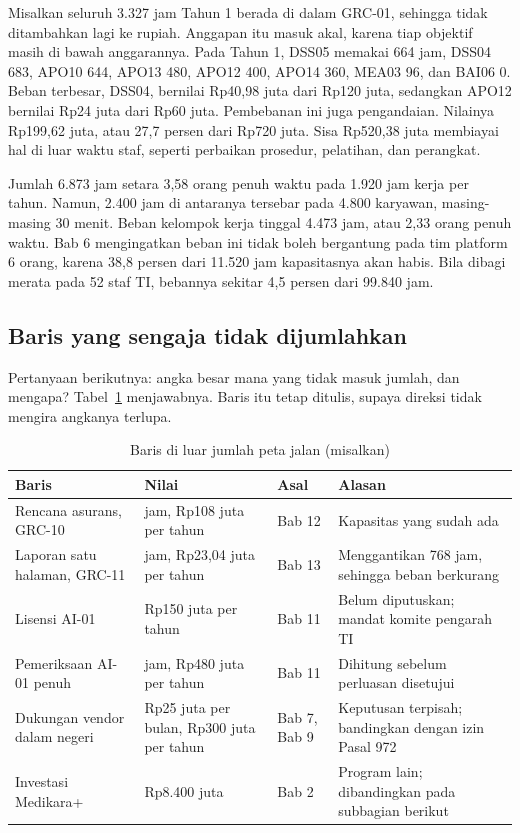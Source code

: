 Misalkan seluruh 3.327 jam Tahun 1 berada di dalam GRC-01, sehingga tidak ditambahkan lagi ke
rupiah. Anggapan itu masuk akal, karena tiap objektif masih di bawah anggarannya. Pada Tahun 1,
DSS05 memakai 664 jam, DSS04 683, APO10 644, APO13 480, APO12 400, APO14 360, MEA03 96, dan BAI06
0. Beban terbesar, DSS04, bernilai Rp40,98 juta dari Rp120 juta, sedangkan APO12 bernilai Rp24
juta dari Rp60 juta. Pembebanan ini juga pengandaian. Nilainya Rp199,62 juta, atau 27,7 persen dari
Rp720 juta. Sisa Rp520,38 juta membiayai hal di luar waktu staf, seperti perbaikan prosedur,
pelatihan, dan perangkat.

Jumlah 6.873 jam setara 3,58 orang penuh waktu pada 1.920 jam kerja per tahun. Namun, 2.400 jam di
antaranya tersebar pada 4.800 karyawan, masing-masing 30 menit. Beban kelompok kerja tinggal 4.473
jam, atau 2,33 orang penuh waktu. Bab 6 mengingatkan beban ini tidak boleh bergantung pada tim
platform 6 orang, karena 38,8 persen dari 11.520 jam kapasitasnya akan habis. Bila dibagi merata
pada 52 staf TI, bebannya sekitar 4,5 persen dari 99.840 jam.

\subsection*{Baris yang sengaja tidak dijumlahkan}

Pertanyaan berikutnya: angka besar mana yang tidak masuk jumlah, dan mengapa?
Tabel~\ref{tab:ch14-di-luar} menjawabnya. Baris itu tetap ditulis, supaya direksi tidak mengira
angkanya terlupa.

\begin{table}[!htb]
  \centering\small
  \caption{Baris di luar jumlah peta jalan (misalkan)}\label{tab:ch14-di-luar}
  \begin{tabularx}{\textwidth}{|>{\raggedright\arraybackslash}p{}|>{\raggedright\arraybackslash}p{}|>{\raggedright\arraybackslash}p{}|>{\raggedright\arraybackslash}X|}
    \hline
    \textbf{Baris} & \textbf{Nilai} & \textbf{Asal} & \textbf{Alasan} \\ \hline
    Rencana asurans, GRC-10 & 1.800 jam, Rp108 juta per tahun & Bab 12 & Kapasitas yang sudah ada
    \\ \hline
    Laporan satu halaman, GRC-11 & 384 jam, Rp23,04 juta per tahun & Bab 13 & Menggantikan 768 jam,
    sehingga beban berkurang \\ \hline
    Lisensi AI-01 & Rp150 juta per tahun & Bab 11 & Belum diputuskan; mandat komite pengarah TI \\
    \hline
    Pemeriksaan AI-01 penuh & 8.000 jam, Rp480 juta per tahun & Bab 11 & Dihitung sebelum perluasan
    disetujui \\ \hline
    Dukungan vendor dalam negeri & Rp25 juta per bulan, Rp300 juta per tahun & Bab 7, Bab 9 &
    Keputusan terpisah; bandingkan dengan izin Pasal 972 \\ \hline
    Investasi Medikara+ & Rp8.400 juta & Bab 2 & Program lain; dibandingkan pada subbagian berikut
    \\ \hline
  \end{tabularx}
\end{table}

